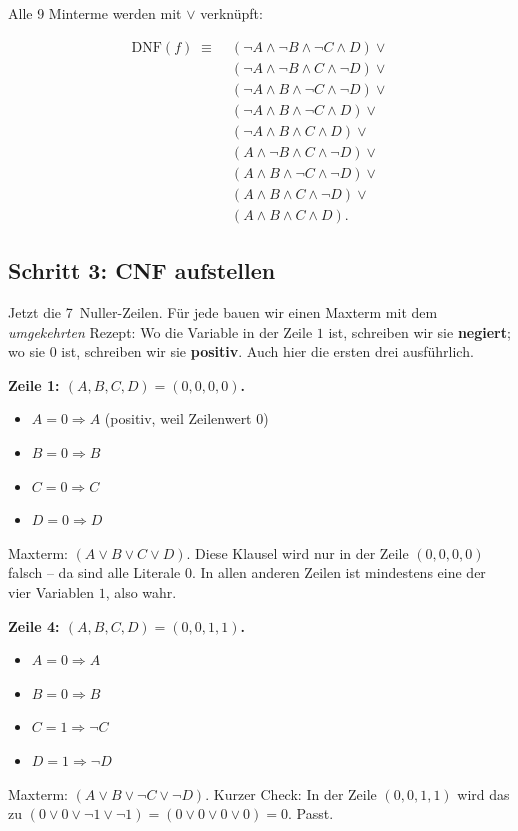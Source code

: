 \documentclass[a4paper,12pt]{article}
\begin{document}
Alle 9 Minterme werden mit $\vee$ verkn\"upft:

\begin{merkbox}[title={Ergebnis: DNF}]
\begin{align*}
\text{DNF}(f) \;\equiv\; &(\neg A \wedge \neg B \wedge \neg C \wedge D) \vee {} \\
& (\neg A \wedge \neg B \wedge C \wedge \neg D) \vee {} \\
& (\neg A \wedge B \wedge \neg C \wedge \neg D) \vee {} \\
& (\neg A \wedge B \wedge \neg C \wedge D) \vee {} \\
& (\neg A \wedge B \wedge C \wedge D) \vee {} \\
& (A \wedge \neg B \wedge C \wedge \neg D) \vee {} \\
& (A \wedge B \wedge \neg C \wedge \neg D) \vee {} \\
& (A \wedge B \wedge C \wedge \neg D) \vee {} \\
& (A \wedge B \wedge C \wedge D).
\end{align*}
\end{merkbox}

\subsection*{Schritt 3: CNF aufstellen}

Jetzt die 7~Nuller-Zeilen. F\"ur jede bauen wir einen Maxterm mit dem
\emph{umgekehrten} Rezept: Wo die Variable in der Zeile $1$ ist,
schreiben wir sie \textbf{negiert}; wo sie $0$ ist, schreiben wir sie
\textbf{positiv}. Auch hier die ersten drei ausf\"uhrlich.

\textbf{Zeile 1: $(A,B,C,D) = (0,0,0,0)$.}
\begin{itemize}[nosep]
\item $A = 0 \Rightarrow A$ (positiv, weil Zeilenwert 0)
\item $B = 0 \Rightarrow B$
\item $C = 0 \Rightarrow C$
\item $D = 0 \Rightarrow D$
\end{itemize}
Maxterm: $(A \vee B \vee C \vee D)$. Diese Klausel wird nur in der
Zeile $(0,0,0,0)$ falsch -- da sind alle Literale $0$. In allen
anderen Zeilen ist mindestens eine der vier Variablen $1$, also wahr.

\textbf{Zeile 4: $(A,B,C,D) = (0,0,1,1)$.}
\begin{itemize}[nosep]
\item $A = 0 \Rightarrow A$
\item $B = 0 \Rightarrow B$
\item $C = 1 \Rightarrow \neg C$
\item $D = 1 \Rightarrow \neg D$
\end{itemize}
Maxterm: $(A \vee B \vee \neg C \vee \neg D)$. Kurzer Check: In der
Zeile $(0,0,1,1)$ wird das zu $(0 \vee 0 \vee \neg 1 \vee \neg 1) =
(0 \vee 0 \vee 0 \vee 0) = 0$. Passt.
\end{document}
